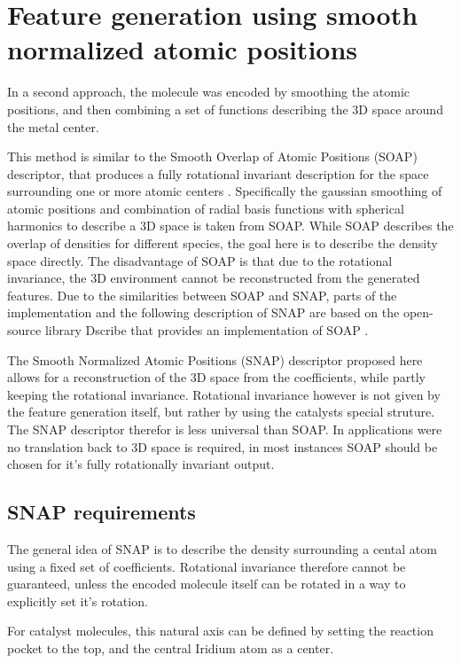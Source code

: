 \section{Feature generation using smooth normalized atomic positions}
\label{ch:SNAP}
In a second approach, the molecule was encoded by smoothing the atomic positions, 
and then combining a set of functions describing the 3D space around the metal center.

This method is similar to the Smooth Overlap of Atomic Positions (SOAP) descriptor, that produces a 
fully rotational invariant description for the space surrounding one or more atomic centers \cite{Bart_k_2013}.
Specifically the gaussian smoothing of atomic positions and combination of radial basis functions with
spherical harmonics to describe a 3D space is taken from SOAP.
While SOAP describes the overlap of densities for different species, the goal here is to describe the density space directly.
The disadvantage of SOAP is that due to the rotational invariance, the 3D environment cannot be reconstructed from the generated features.
Due to the similarities between SOAP and SNAP, parts of the implementation and the following description of SNAP are based 
on the open-source library Dscribe that provides an implementation of SOAP \cite{dscribe}.

The Smooth Normalized Atomic Positions (SNAP) descriptor proposed here allows for a reconstruction of the 3D space from the coefficients, 
while partly keeping the rotational invariance.
Rotational invariance however is not given by the feature generation itself, but rather by using the catalysts special struture.
The SNAP descriptor therefor is less universal than SOAP. 
In applications were no translation back to 3D space is required,
in most instances SOAP should be chosen for it's fully rotationally invariant output.

\subsection{SNAP requirements}

The general idea of SNAP is to describe the density surrounding a cental atom using a fixed set of coefficients.
Rotational invariance therefore cannot be guaranteed, unless the encoded molecule itself can be rotated in a way to explicitly set it's rotation.

For catalyst molecules, this natural axis can be defined by setting the reaction pocket to the top, and the central Iridium atom as a center.

